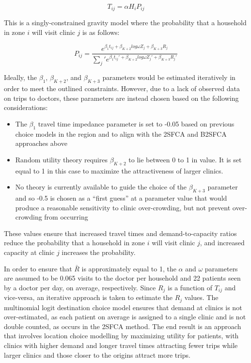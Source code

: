 \documentclass[]{elsarticle} %
\providecommand{\tightlist}{%
  \setlength{\itemsep}{0pt}\setlength{\parskip}{0pt}}
\begin{document}
\[
T_{ij} = \alpha H_i P_{ij}
\]

This is a singly-constrained gravity model where the probability that a
household in zone \(i\) will visit clinic \(j\) is as follows:

\[
P_{ij} = \frac{e^{\beta_1 t_{ij} + \beta_{K+2} log \omega Z_j + \beta_{K + 3} R_j}}{\sum_j\prime e^{\beta_1 t_{ij}\prime + \beta_{K+2} log \omega Z_j\prime + \beta_{K + 3} R_j\prime}}
\]

Ideally, the \(\beta_1\), \(\beta_{K+2}\), and \(\beta_{K + 3}\)
parameters would be estimated iteratively in order to meet the outlined
constraints. However, due to a lack of observed data on trips to
doctors, these parameters are instead chosen based on the following
considerations:

\begin{itemize}
\tightlist
\item
  The \(\beta_1\) travel time impedance parameter is set to -0.05 based
  on previous choice models in the region and to align with the 2SFCA
  and B2SFCA approaches above
\item
  Random utility theory requires \(\beta_{K+2}\) to lie between 0 to 1
  in value. It is set equal to 1 in this case to maximize the
  attractiveness of larger clinics.
\item
  No theory is currently available to guide the choice of the
  \(\beta_{K+3}\) parameter and so -0.5 is chosen as a ``first guess''
  at a parameter value that would produce a reasonable sensitivity to
  clinic over-crowding, but not prevent over-crowding from occurring
\end{itemize}

These values ensure that increased travel times and demand-to-capacity
ratios reduce the probability that a household in zone \(i\) will visit
clinic \(j\), and increased capacity at clinic \(j\) increases the
probability.

In order to ensure that \(\bar{R}\) is approximately equal to 1, the
\(\alpha\) and \(\omega\) parameters are assumed to be 0.065 visits to
the doctor per household and 22 patients seen by a doctor per day, on
average, respectively. Since \(R_j\) is a function of \(T_{ij}\) and
vice-versa, an iterative approach is taken to estimate the \(R_j\)
values. The multinomial logit destination choice model ensures that
demand at clinics is not over-estimated, as each patient on average is
assigned to a single clinic and is not double counted, as occurs in the
2SFCA method. The end result is an approach that involves location
choice modelling by maximizing utility for patients, with clinics with
higher demand and longer travel times attracting fewer trips while
larger clinics and those closer to the origins attract more trips.
\end{document}

